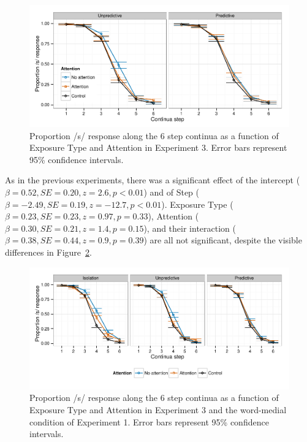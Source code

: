 \begin{figure}[!ht]
\caption{Proportion /s/ response along the 6 step continua as a function of Exposure Type and Attention in Experiment 3.  Error bars represent 95\% confidence intervals.}
\label{fig:exp3categ}
\begin{center}
\includegraphics[width=\textwidth]{graphs/exp3_categresults}
\end{center}
\end{figure}

As in the previous experiments, there was a significant effect of the intercept ($\beta = 0.52, SE = 0.20, z = 2.6, p < 0.01$) and of Step ($\beta = -2.49, SE = 0.19, z = -12.7, p < 0.01$).
Exposure Type ($\beta = 0.23, SE = 0.23, z = 0.97, p = 0.33$), Attention ($\beta = 0.30, SE = 0.21, z = 1.4, p = 0.15$), and their interaction ($\beta = 0.38, SE = 0.44, z = 0.9, p = 0.39$) are all not significant, despite the visible differences in Figure~\ref{fig:exp23categ}.


\begin{figure}[!ht]
\caption{Proportion /s/ response along the 6 step continua as a function of Exposure Type and Attention in Experiment 3 and the word-medial condition of Experiment 1.  Error bars represent 95\% confidence intervals.}
\label{fig:exp23categ}
\begin{center}
\includegraphics[width=\textwidth]{graphs/exp23_categresults}
\end{center}
\end{figure}


